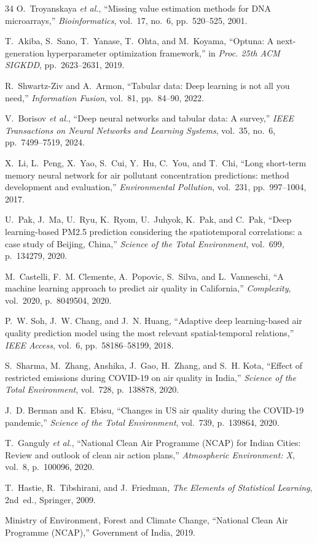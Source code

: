 \documentclass[conference]{IEEEtran}
\begin{document}
\begin{thebibliography}{34}
O.~Troyanskaya \textit{et al.}, ``Missing value estimation methods for DNA microarrays,'' \textit{Bioinformatics}, vol.~17, no.~6, pp.~520--525, 2001.

T.~Akiba, S.~Sano, T.~Yanase, T.~Ohta, and M.~Koyama, ``Optuna: A next-generation hyperparameter optimization framework,'' in \textit{Proc. 25th ACM SIGKDD}, pp.~2623--2631, 2019.

R.~Shwartz-Ziv and A.~Armon, ``Tabular data: Deep learning is not all you need,'' \textit{Information Fusion}, vol.~81, pp.~84--90, 2022.

V.~Borisov \textit{et al.}, ``Deep neural networks and tabular data: A survey,'' \textit{IEEE Transactions on Neural Networks and Learning Systems}, vol.~35, no.~6, pp.~7499--7519, 2024.

X.~Li, L.~Peng, X.~Yao, S.~Cui, Y.~Hu, C.~You, and T.~Chi, ``Long short-term memory neural network for air pollutant concentration predictions: method development and evaluation,'' \textit{Environmental Pollution}, vol.~231, pp.~997--1004, 2017.

U.~Pak, J.~Ma, U.~Ryu, K.~Ryom, U.~Juhyok, K.~Pak, and C.~Pak, ``Deep learning-based PM2.5 prediction considering the spatiotemporal correlations: a case study of Beijing, China,'' \textit{Science of the Total Environment}, vol.~699, p.~134279, 2020.

M.~Castelli, F.~M. Clemente, A.~Popovic, S.~Silva, and L.~Vanneschi, ``A machine learning approach to predict air quality in California,'' \textit{Complexity}, vol.~2020, p.~8049504, 2020.

P.~W. Soh, J.~W. Chang, and J.~N. Huang, ``Adaptive deep learning-based air quality prediction model using the most relevant spatial-temporal relations,'' \textit{IEEE Access}, vol.~6, pp.~58186--58199, 2018.

S.~Sharma, M.~Zhang, Anshika, J.~Gao, H.~Zhang, and S.~H. Kota, ``Effect of restricted emissions during COVID-19 on air quality in India,'' \textit{Science of the Total Environment}, vol.~728, p.~138878, 2020.

J.~D. Berman and K.~Ebisu, ``Changes in US air quality during the COVID-19 pandemic,'' \textit{Science of the Total Environment}, vol.~739, p.~139864, 2020.

T.~Ganguly \textit{et al.}, ``National Clean Air Programme (NCAP) for Indian Cities: Review and outlook of clean air action plans,'' \textit{Atmospheric Environment: X}, vol.~8, p.~100096, 2020.

T.~Hastie, R.~Tibshirani, and J.~Friedman, \textit{The Elements of Statistical Learning}, 2nd~ed., Springer, 2009.

Ministry of Environment, Forest and Climate Change, ``National Clean Air Programme (NCAP),'' Government of India, 2019.

\end{thebibliography}
\end{document}
